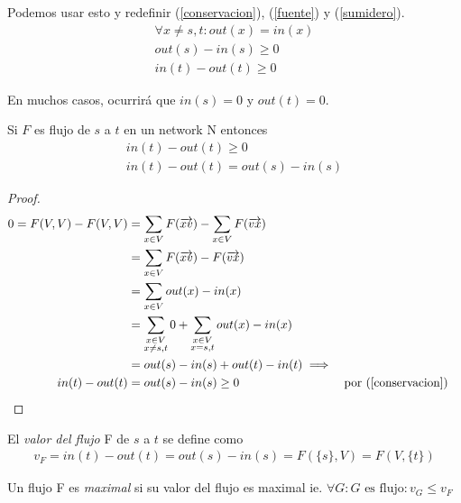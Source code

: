 Podemos usar esto y redefinir (\ref{conservacion}), (\ref{fuente}) y (\ref{sumidero}).
\begin{align}
    \forall x \neq s,t : out(x) = in(x)\\
    out(s) - in(s) \ge 0 \\
    in(t) - out(t) \ge 0
\end{align}

En muchos casos, ocurrirá que $in(s) = 0$ y $out(t) = 0$.


\begin{proposition}
Si $F$ es flujo de $s$ a $t$ en un network N entonces
\begin{align}
    in(t) - out(t) \ge 0\\
    in(t) - out(t) = out(s) - in(s)
\end{align}
\end{proposition}
\begin{proof}
\begin{align}
    0 = F(V,V) - F(V,V) &= \sum_{x\in V} F(\overrightarrow{xv}) - \sum_{x\in V} F(\overrightarrow{vx}) \\
                        &= \sum_{x\in V} F(\overrightarrow{xv}) - F(\overrightarrow{vx}) \\
                        &= \sum_{x\in V} out(x) - in(x) \\
                        &= \sum_{\substack{x\in V \\ x\neq s,t}} 0 + \sum_{\substack{x\in V \\ x = s,t}} out(x) - in(x) \\
                        &= out(s) - in(s) + out(t) - in(t) \implies \\
      in(t) - out(t) &= out(s) - in(s) \ge 0 &&\text{por (\ref{conservacion})}
\end{align}
\end{proof}

\begin{definition}
El \emph{valor del flujo} F de $s$ a $t$ se define como 
\begin{align}
    v_F = in(t) - out(t) = out(s) - in(s) = F(\{s\}, V) = F(V, \{t\})
\end{align}
\end{definition}

\begin{definition}
Un flujo F es \emph{maximal} si su valor del flujo es maximal ie.
$\forall G: G \text{ es flujo} : v_G \le v_F$
\end{definition}

